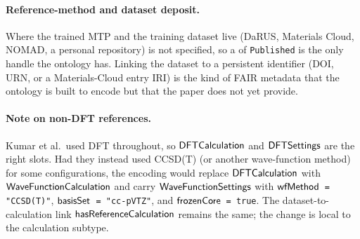 \paragraph{Reference-method and dataset deposit.}
Where the trained MTP and the training dataset live (DaRUS, Materials
Cloud, NOMAD, a personal repository) is not specified, so a
\datasetProvenanceR{} of \texttt{Published} is the only handle the
ontology has. Linking the dataset to a persistent identifier (DOI,
URN, or a Materials-Cloud entry IRI) is the kind of FAIR metadata
that the ontology is built to encode but that the paper does not yet
provide.

\paragraph{Note on non-DFT references.}
Kumar et al.\ used DFT throughout, so $\mathsf{DFTCalculation}$ and
$\mathsf{DFTSettings}$ are the right slots. Had they instead used
CCSD(T) (or another wave-function method) for some configurations,
the encoding would replace $\mathsf{DFTCalculation}$ with
$\mathsf{WaveFunctionCalculation}$ and carry $\mathsf{WaveFunctionSettings}$ with
$\mathsf{wfMethod}$~\texttt{= "CCSD(T)"}, $\mathsf{basisSet}$~\texttt{= "cc-pVTZ"},
and $\mathsf{frozenCore}$~\texttt{= true}. The dataset-to-calculation link
$\mathsf{hasReferenceCalculation}$ remains the same; the change is local to
the calculation subtype.

